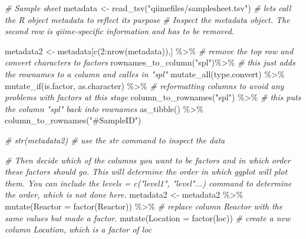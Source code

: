 \documentclass[
]{book}
\newenvironment{Shaded}{\begin{snugshade}}{\end{snugshade}}
\newcommand{\AttributeTok}[1]{\textcolor[rgb]{0.77,0.63,0.00}{#1}}
\newcommand{\CommentTok}[1]{\textcolor[rgb]{0.56,0.35,0.01}{\textit{#1}}}
\newcommand{\DecValTok}[1]{\textcolor[rgb]{0.00,0.00,0.81}{#1}}
\newcommand{\FunctionTok}[1]{\textcolor[rgb]{0.00,0.00,0.00}{#1}}
\newcommand{\NormalTok}[1]{#1}
\newcommand{\OtherTok}[1]{\textcolor[rgb]{0.56,0.35,0.01}{#1}}
\newcommand{\SpecialCharTok}[1]{\textcolor[rgb]{0.00,0.00,0.00}{#1}}
\newcommand{\StringTok}[1]{\textcolor[rgb]{0.31,0.60,0.02}{#1}}
\begin{document}
\begin{Shaded}
\begin{Highlighting}[]
\CommentTok{\# Sample sheet}
\NormalTok{metadata }\OtherTok{\textless{}{-}} \FunctionTok{read\_tsv}\NormalTok{(}\StringTok{"qiimefiles/samplesheet.tsv"}\NormalTok{)  }\CommentTok{\# lets call the R object \textquotesingle{}metadata\textquotesingle{} to reflect its purpose }
\CommentTok{\# Inspect the metadata object. The second row is qiime{-}specific information and has to be removed. }

\NormalTok{metadata2 }\OtherTok{\textless{}{-}}\NormalTok{ metadata[}\FunctionTok{c}\NormalTok{(}\DecValTok{2}\SpecialCharTok{:}\FunctionTok{nrow}\NormalTok{(metadata)),] }\SpecialCharTok{\%\textgreater{}\%}     \CommentTok{\# remove the top row and convert characters to factors}
  \FunctionTok{rownames\_to\_column}\NormalTok{(}\StringTok{"spl"}\NormalTok{)}\SpecialCharTok{\%\textgreater{}\%} \CommentTok{\# this just adds the rownames to a column and calles in "spl"}
  \FunctionTok{mutate\_all}\NormalTok{(type.convert) }\SpecialCharTok{\%\textgreater{}\%}
  \FunctionTok{mutate\_if}\NormalTok{(is.factor, as.character) }\SpecialCharTok{\%\textgreater{}\%}  \CommentTok{\# reformatting columns to avoid any problems with factors at this stage}
  \FunctionTok{column\_to\_rownames}\NormalTok{(}\StringTok{"spl"}\NormalTok{) }\SpecialCharTok{\%\textgreater{}\%}  \CommentTok{\# this puts the column "spl" back into rownames}
  \FunctionTok{as\_tibble}\NormalTok{() }\SpecialCharTok{\%\textgreater{}\%} 
  \FunctionTok{column\_to\_rownames}\NormalTok{(}\StringTok{"\#SampleID"}\NormalTok{)}

\CommentTok{\# str(metadata2)  \# use the \textasciigrave{}str\textasciigrave{} command to inspect the data}

\CommentTok{\# Then decide which of the columns you want to be factors and in which order these factors should go. This will determine the order in which ggplot will plot them. You can include the levels = c("level1", "level"...)  command to determine the order, which is not done here. }
\NormalTok{metadata2  }\OtherTok{\textless{}{-}}\NormalTok{ metadata2 }\SpecialCharTok{\%\textgreater{}\%} 
  \FunctionTok{mutate}\NormalTok{(}\AttributeTok{Reactor =} \FunctionTok{factor}\NormalTok{(Reactor)) }\SpecialCharTok{\%\textgreater{}\%}  \CommentTok{\# replace column Reactor with the same values but made a factor. }
  \FunctionTok{mutate}\NormalTok{(}\AttributeTok{Location =} \FunctionTok{factor}\NormalTok{(loc))     }\CommentTok{\# create a new column \textquotesingle{}Location\textquotesingle{}, which is a factor of \textquotesingle{}loc\textquotesingle{}}


\end{Highlighting}
\end{Shaded}
\end{document}

